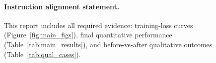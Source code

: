 \documentclass{article}
\begin{document}
\paragraph{Instruction alignment statement.}
This report includes all required evidence: training-loss curves (Figure~\ref{fig:main_figs}), final quantitative performance (Table~\ref{tab:main_results}), and before-vs-after qualitative outcomes (Table~\ref{tab:qual_cases}).

{\footnotesize


}
\end{document}
